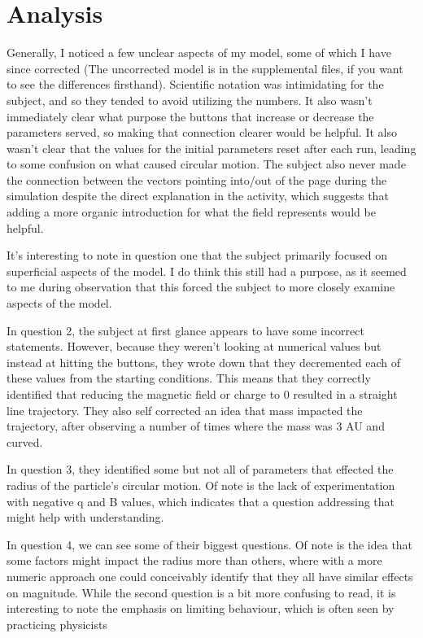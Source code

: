 \documentclass[11pt]{article}
\begin{document}
		\section*{Analysis}
		
			Generally, I noticed a few unclear aspects of my model, some of which I have since corrected (The uncorrected model is in the supplemental files, if you want to see the differences firsthand). Scientific notation was intimidating for the subject, and so they tended to avoid utilizing the numbers. It also wasn't immediately clear what purpose the buttons that increase or decrease the parameters served, so making that connection clearer would be helpful. It also wasn't clear that the values for the initial parameters reset after each run, leading to some confusion on what caused circular motion. The subject also never made the connection between the vectors pointing into/out of the page during the simulation despite the direct explanation in the activity, which suggests that adding a more organic introduction for what the field represents would be helpful.
			
			It's interesting to note in question one that the subject primarily focused on superficial aspects of the model. I do think this still had a purpose, as it seemed to me during observation that this forced the subject to more closely examine aspects of the model.
			
			In question 2, the subject at first glance appears to have some incorrect statements. However, because they weren't looking at numerical values but instead at hitting the buttons, they wrote down that they decremented each of these values from the starting conditions. This means that they correctly identified that reducing the magnetic field or charge to 0 resulted in a straight line trajectory. They also self corrected an idea that mass impacted the trajectory, after observing a number of times where the mass was 3 AU and curved.
			
			In question 3, they identified some but not all of parameters that effected the radius of the particle's circular motion. Of note is the lack of experimentation with negative q and B values, which indicates that a question addressing that might help with understanding.
			
			In question 4, we can see some of their biggest questions. Of note is the idea that some factors might impact the radius more than others, where with a more numeric approach one could conceivably identify that they all have similar effects on magnitude. While the second question is a bit more confusing to read, it is interesting to note the emphasis on limiting behaviour, which is often seen by practicing physicists
			
\end{document}
